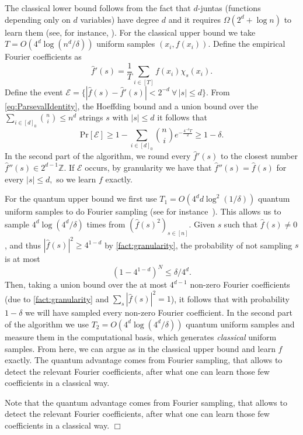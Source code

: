 \documentclass[11pt]{article}
\theoremstyle{plain}
\theoremstyle{plain}
\theoremstyle{definition}
\theoremstyle{remark}
\renewenvironment{proof}[1][]{
    \begin{trivlist}
    \item[\hspace{\labelsep}{\em\noindent Proof#1:\/}]}
    {{\hfill$\Box$}
    \end{trivlist}
}
\theoremstyle{named}
\begin{document}
\begin{proof}
    The classical lower bound follows from the fact that $d$-juntas (functions depending only on $d$ variables) have degree $d$ and it requires $\Omega(2^d+\log n)$ to learn them (see, for instance, \cite[Lemma IV.1]{atici2007quantum}).
     For the classical upper bound we take $T=O(4^d\log(n^d/\delta))$ uniform samples $(x_i,f(x_i))$. Define the empirical Fourier coefficients as $$\widehat f'(s)=\frac{1}{T}\sum_{i\in [T]}f(x_i)\chi_s(x_i).$$
    Define the event $\mathcal{E}=\{|\widehat f(s)-\widehat f'(s)|<2^{-d}\ \forall\, |s|\leq d\}.$
    From \cref{eq:ParsevalIdentity}, the Hoeffding bound and a union bound over the $\sum_{i\in [d]_0}{n\choose i}\leq n^d$ strings $s$ with $|s|\leq d$ it follows that $$\mathrm{Pr}[\mathcal{E}]\geq 1-\sum_{i\in [d]_0}{n\choose i}e^{-\frac{4^{-d}T}{2}}\geq 1-\delta.$$
    In the second part of the algorithm, we round every $\widehat f'(s)$ to the closest number $\widehat f''(s)\in 2^{d-1}\mathbb Z$. If $\mathcal{E}$ occurs, by granularity we have that $\widehat f''(s)=\widehat f(s)$ for every $|s|\leq d,$ so we learn $f$ exactly. 
    
    For the quantum upper bound we first use $T_1=O(4^dd\log^2(1/\delta))$ quantum uniform samples to do Fourier sampling (see for instance~\cite[Lemma 4]{arunachalam2021two}). This allows us to sample $4^d\log(4^d/\delta)$ times from $(\widehat f(s)^2)_{s\in [n]}$. 
    Given $s$ such that $\widehat f(s)\neq 0$, and thus $|\widehat f(s)|^2\geq 4^{1-d}$ by \cref{fact:granularity}, the probability of not sampling $s$ is at most 
    $$
    \left(1-4^{1-d}\right)^N\leq {\delta}/{ 4^d}.
    $$
    Then, taking a union bound over the at most $4^{d-1}$ non-zero Fourier coefficients (due to \cref{fact:granularity} and $\sum_s|\widehat f(s)|^2=1$), it follows that with probability $1-\delta$ we will have sampled every non-zero Fourier coefficient. In the second part of the algorithm we use $T_2=O(4^d\log(4^d/\delta))$ quantum uniform samples and measure them in the computational basis, which generates \emph{classical} uniform samples. From here, we can argue as in the classical upper bound and learn $f$ exactly. The quantum advantage comes from Fourier sampling, that allows to detect the relevant Fourier coefficients, after what one can learn those few coefficients in a classical way.

    Note that the  quantum advantage comes from Fourier sampling, that allows to detect the relevant Fourier coefficients, after what one can learn those few coefficients in a classical way.
\end{proof}
\end{document}
